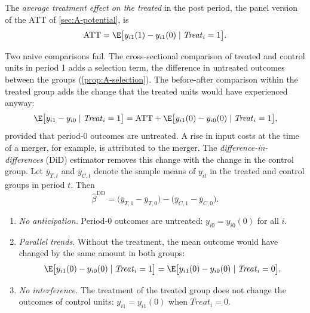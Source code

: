 \begin{definition}\label{def:A-att}
The \emph{average treatment effect on the treated} in the post period, the panel version of the ATT of
\cref{sec:A-potential}, is
\begin{equation*}
\mathrm{ATT}=\E\big[y_{i1}(1)-y_{i1}(0)\mid \mathit{Treat}_i=1\big].
\end{equation*}
\end{definition}

Two naive comparisons fail. The cross-sectional comparison of treated and control units in period 1 adds a
selection term, the difference in untreated outcomes between the groups (\cref{prop:A-selection}). The
before-after comparison within the treated group adds the change that the treated units would have experienced
anyway:
\begin{equation*}
\E\big[y_{i1}-y_{i0}\mid\mathit{Treat}_i=1\big]=\mathrm{ATT}+\E\big[y_{i1}(0)-y_{i0}(0)\mid\mathit{Treat}_i=1\big],
\end{equation*}
provided that period-0 outcomes are untreated. A rise in input costs at the time of a merger, for example, is
attributed to the merger. The \emph{difference-in-differences} (DiD) estimator removes this change with the change
in the control group. Let $\bar y_{T,t}$ and $\bar y_{C,t}$ denote the sample means of $y_{it}$ in the treated and
control groups in period $t$. Then
\begin{equation}\label{eq:A-did-estimator}
\hat\beta^{\mathrm{DD}}=\big(\bar y_{T,1}-\bar y_{T,0}\big)-\big(\bar y_{C,1}-\bar y_{C,0}\big).
\end{equation}

\begin{assumption}\label{ass:A-did}
\leavevmode
\begin{enumerate}[label=(\roman*)]
\item \emph{No anticipation.} Period-0 outcomes are untreated: $y_{i0}=y_{i0}(0)$ for all $i$.
\item \emph{Parallel trends.} Without the treatment, the mean outcome would have changed by the same amount in both
groups:
\begin{equation*}
\E\big[y_{i1}(0)-y_{i0}(0)\mid\mathit{Treat}_i=1\big]=\E\big[y_{i1}(0)-y_{i0}(0)\mid\mathit{Treat}_i=0\big].
\end{equation*}
\item \emph{No interference.} The treatment of the treated group does not change the outcomes of control units:
$y_{i1}=y_{i1}(0)$ when $\mathit{Treat}_i=0$.
\end{enumerate}
\end{assumption}

